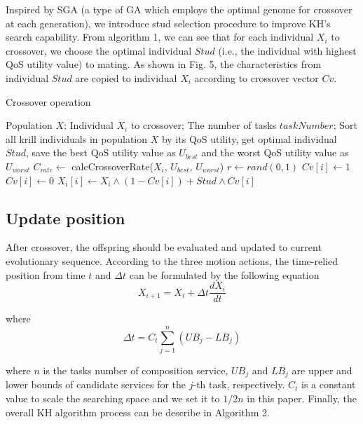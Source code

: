 \documentclass[10pt,journal,compsoc]{IEEEtran}
\begin{document}
Inspired by SGA \cite{khatib1998stud} (a type of GA which employs the optimal genome for crossover at each generation), we introduce stud selection procedure to improve KH's search capability.
From algorithm 1, we can see that for each individual $X_i$ to crossover, we choose the optimal individual $Stud$ (i.e., the individual with highest QoS utility value) to mating. As shown in Fig. 5, the characteristics from individual $Stud$ are copied to individual $X_i$ according to crossover vector $Cv$. 

\begin{algorithm}
\caption{Crossover operation}
\label{alg1}
\begin{algorithmic}[1]

\REQUIRE Population $X$; Individual $X_i$ to crossover; The number of tasks $taskNumber$; 
\STATE Sort all krill individuals in population $X$ by its QoS utility, get optimal individual $Stud$, save the best QoS utility value as $U_{best}$ and the worst QoS utility value as $U_{worst}$
\STATE $C_{rate} \leftarrow$ calcCrossoverRate($X_i$, $U_{best}$, $U_{worst}$)
\STATE $r \leftarrow rand(0,1)$
\STATE $Cv[i] \leftarrow 1$
\ELSE
\STATE $Cv[i] \leftarrow 0$
\ENDIF
\ENDFOR
{}
\STATE $X_i[i] \leftarrow X_i \wedge  (1-Cv[i]) + Stud \wedge Cv[i]$ 
\ENDFOR
\end{algorithmic}
\end{algorithm}

\subsection{Update position}
After crossover, the offspring should be evaluated and updated to current evolutionary sequence.
According to the three motion actions, the time-relied position from time $t$ and $\Delta t$ can be formulated by the following equation
\begin{equation}
X_{i+1} = X_i + \Delta t \frac{dX_i}{dt}
\end{equation}

where
\begin{equation}
\Delta t = C_t\sum_{j=1}^{n}(UB_j - LB_j)
\end{equation}

where $n$ is the tasks number of composition service, $UB_j$ and $LB_j$ are upper and lower bounds of candidate services for the $j$-th task, respectively. $C_t$ is a constant value to scale the searching space and we set it to $1/2n$ in this paper. Finally, the overall KH algorithm process can be describe in Algorithm 2.
\end{document}
